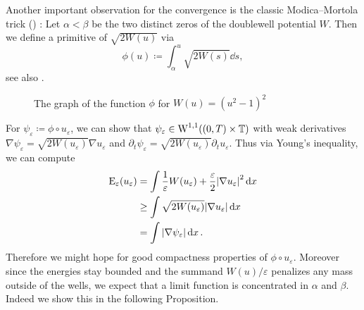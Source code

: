 Another important observation for the convergence is the classic 
Modica--Mortola 
trick (\cite{modica_mortola_un_esempio_di_gamma_convergenza}) : Let $ \alpha < 
\beta $ be the two distinct 
zeros of the doublewell potential $ W $.
Then we define a primitive of $ \sqrt{ 2 W ( u ) } $ via
\begin{equation*}
	\phi ( u ) 
	\coloneqq
	\int_{ \alpha }^{ u }
	\sqrt{ 2 W ( s ) }
	\dd{ s },
\end{equation*}
see also .
\begin{figure}[ht]
	\centering
	\caption{The graph of the function $ \phi $ for $ W ( u ) = ( u^{ 2 } - 1 
	)^{ 2 } $ }
	\label{graph_of_phi}
\end{figure}
For $ \psi_{ \varepsilon } \coloneqq \phi \circ u_{ \varepsilon } $, we can 
show that $ \psi_{ \varepsilon } \in \operatorname{W}^{ 1, 1 } ( ( 0 , T ) \times 
\operatorname{\mathbb{T}} ) $ with weak derivatives $ \nabla \psi_{ \varepsilon } = \sqrt{ 2 W 
( u_{ \varepsilon } ) } \nabla u_{ \varepsilon } $ and $ \partial_{ t } \psi_{ 
\varepsilon } = \sqrt{ 2 W ( u_{ \varepsilon } ) } \partial_{ t } u_{ 
\varepsilon } $. 
Thus via Young's inequality, we can compute
\begin{align}
	\operatorname{E}_{ \varepsilon } ( u_{ \varepsilon } )
	& =
	\int
	\frac{ 1 }{ \varepsilon }
	W ( u_{ \varepsilon } ) 
	+
	\frac{ \varepsilon }{ 2 }
	\abs{ \nabla u_{ \varepsilon } }^{ 2 }
	\dd{ x }
	\notag
	\\
	& \geq
	\int
	\sqrt{ 2 W ( u_{ \varepsilon } ) }
	\abs{ \nabla u_{ \varepsilon } }
	\dd{ x }
	\notag
	\\
	& =
	\int
	\abs{ \nabla \psi_{ \varepsilon} }
	\dd{ x }
	\label{modica_mortula_trick}.
\end{align}
Therefore we might hope for good compactness properties of $ \phi 
\circ u_{ \varepsilon } $.
Moreover since the energies stay bounded and the summand $  W ( u ) / 
\varepsilon $ penalizes any mass outside of the wells, we expect that a limit 
function 
is concentrated in $ \alpha $ and $ \beta $.
Indeed we show this in the following Proposition.

